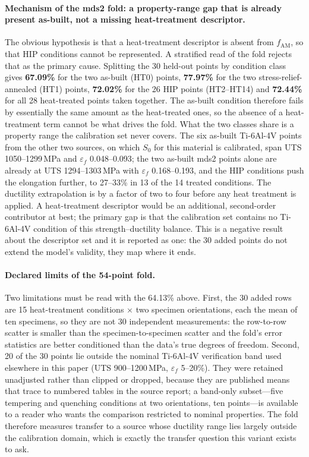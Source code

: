 \documentclass[11pt,a4paper,twocolumn]{article}
\begin{document}
\paragraph{Mechanism of the mds2 fold: a property-range gap that is already present as-built, not a missing heat-treatment descriptor.} The obvious hypothesis is that a heat-treatment descriptor is absent from $f_{\mathrm{AM}}$, so that HIP conditions cannot be represented. A stratified read of the fold rejects that as the primary cause. Splitting the 30 held-out points by condition class gives \textbf{67.09\%} for the two as-built (HT0) points, \textbf{77.97\%} for the two stress-relief-annealed (HT1) points, \textbf{72.02\%} for the 26 HIP points (HT2--HT14) and \textbf{72.44\%} for all 28 heat-treated points taken together. The as-built condition therefore fails by essentially the same amount as the heat-treated ones, so the absence of a heat-treatment term cannot be what drives the fold. What the two classes share is a property range the calibration set never covers. The six as-built Ti-6Al-4V points from the other two sources, on which $S_0$ for this material is calibrated, span UTS 1050--1299\,MPa and $\varepsilon_f$ 0.048--0.093; the two as-built mds2 points alone are already at UTS 1294--1303\,MPa with $\varepsilon_f$ 0.168--0.193, and the HIP conditions push the elongation further, to 27--33\% in 13 of the 14 treated conditions. The ductility extrapolation is by a factor of two to four before any heat treatment is applied. A heat-treatment descriptor would be an additional, second-order contributor at best; the primary gap is that the calibration set contains no Ti-6Al-4V condition of this strength--ductility balance. This is a negative result about the descriptor set and it is reported as one: the 30 added points do not extend the model's validity, they map where it ends.

\paragraph{Declared limits of the 54-point fold.} Two limitations must be read with the 64.13\% above. First, the 30 added rows are 15 heat-treatment conditions $\times$ two specimen orientations, each the mean of ten specimens, so they are not 30 independent measurements: the row-to-row scatter is smaller than the specimen-to-specimen scatter and the fold's error statistics are better conditioned than the data's true degrees of freedom. Second, 20 of the 30 points lie outside the nominal Ti-6Al-4V verification band used elsewhere in this paper (UTS 900--1200\,MPa, $\varepsilon_f$ 5--20\%). They were retained unadjusted rather than clipped or dropped, because they are published means that trace to numbered tables in the source report; a band-only subset---five tempering and quenching conditions at two orientations, ten points---is available to a reader who wants the comparison restricted to nominal properties. The fold therefore measures transfer to a source whose ductility range lies largely outside the calibration domain, which is exactly the transfer question this variant exists to ask.
\end{document}
